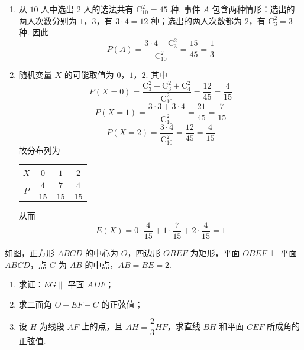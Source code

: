 \begin{solution}
\begin{enumerate}
\item 从 \(10\) 人中选出 \(2\) 人的选法共有 \(\mathrm C_{10}^2=45\) 种.
事件 \(A\) 包含两种情形：选出的两人次数分别为 \(1\)，\(3\)，有 \(3\cdot4=12\) 种；选出的两人次数都为 \(2\)，有 \(\mathrm C_3^2=3\) 种. 因此
\[
P(A)=\frac{3\cdot4+\mathrm C_3^2}{\mathrm C_{10}^2}=\frac{15}{45}=\frac13
\]

\item 随机变量 \(X\) 的可能取值为 \(0\)，\(1\)，\(2\). 其中
\[
P(X=0)=\frac{\mathrm C_3^2+\mathrm C_3^2+\mathrm C_4^2}{\mathrm C_{10}^2}=\frac{12}{45}=\frac4{15}
\]
\[
P(X=1)=\frac{3\cdot3+3\cdot4}{\mathrm C_{10}^2}=\frac{21}{45}=\frac7{15}
\]
\[
P(X=2)=\frac{3\cdot4}{\mathrm C_{10}^2}=\frac{12}{45}=\frac4{15}
\]
故分布列为
\begin{center}
\begin{tabular}{c|ccc}
\hline
\(X\) & \(0\) & \(1\) & \(2\) \\
\hline
\(P\) & \(\dfrac4{15}\) & \(\dfrac7{15}\) & \(\dfrac4{15}\) \\
\hline
\end{tabular}
\end{center}
从而
\[
E(X)=0\cdot\frac4{15}+1\cdot\frac7{15}+2\cdot\frac4{15}=1
\]
\end{enumerate}
\end{solution}

\begin{problem}
如图，正方形 \(ABCD\) 的中心为 \(O\)，四边形 \(OBEF\) 为矩形，平面 \(OBEF\perp\) 平面 \(ABCD\)，点 \(G\) 为 \(AB\) 的中点，\(AB=BE=2\).

\begin{enumerate}
\item 求证：\(EG\parallel\) 平面 \(ADF\)；
\item 求二面角 \(O-EF-C\) 的正弦值；
\item 设 \(H\) 为线段 \(AF\) 上的点，且 \(AH=\dfrac23HF\)，求直线 \(BH\) 和平面 \(CEF\) 所成角的正弦值.
\end{enumerate}

\end{problem}

